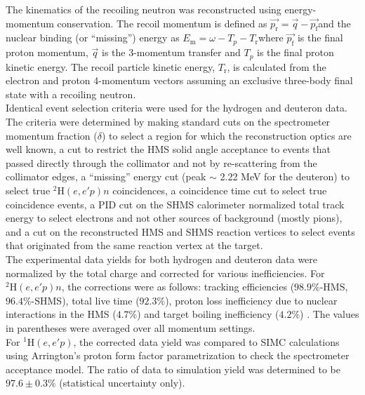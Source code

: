 \indent The kinematics of the recoiling neutron was reconstructed using energy-momentum conservation. The recoil momentum is defined as $\vec{p_{\mathrm{r}}} = \vec{q} - \vec{p_{\mathrm{f}}}$\DIFaddbegin \DIFadd{,
}\DIFaddend and the nuclear binding (or ``missing'') energy as $E_{\mathrm{m}} = \omega - T_{p} - T_{\mathrm{r}}$\DIFaddbegin \DIFadd{, }\DIFaddend where $\vec{p_{\mathrm{f}}}$ is the final proton momentum, $\vec{q}$ is the
3-momentum transfer and $T_{p}$ is the final proton kinetic energy. The recoil particle kinetic energy, $T_{\mathrm{r}}$, is calculated from the electron and proton
4-momentum vectors assuming an exclusive three-body final state with a recoiling neutron.\\
\indent Identical event selection criteria were used for the hydrogen and deuteron data. The criteria were determined by making standard cuts on the spectrometer momentum fraction ($\delta$) to select a region for which the reconstruction optics
are well known,  a cut to restrict the HMS solid angle acceptance to events that passed directly through the collimator and not by re-scattering from the collimator edges, a ``missing''
energy cut (peak $\sim$ 2.22 MeV for the deuteron) to select true $^{2}\mathrm{H}(e,e'p)n$ coincidences, a coincidence time cut to select true coincidence events, a PID cut on the
SHMS calorimeter normalized total track energy to select electrons and not other sources of background (mostly pions), and a cut on the reconstructed HMS and SHMS reaction vertices to select events that 
originated from the same reaction vertex at the target.\\
\indent The experimental data yields for both hydrogen and deuteron data were normalized by the total charge and corrected for various inefficiencies. For $^{2}\mathrm{H}(e,e'p)n$, the corrections
were as follows: tracking efficiencies ($98.9 \%$-HMS, $96.4 \%$-SHMS), total live time ($92.3 \%$), proton loss inefficiency due to nuclear interactions in the HMS ($4.7 \%$) \cite{cyero_phdthesis} and
target boiling inefficiency ($4.2 \%$) \cite{cyero_phdthesis}. The values in parentheses were averaged over all momentum settings. \\
\indent For $^{1}\mathrm{H}(e,e'p)$, the corrected data yield was compared to SIMC calculations using \DIFdelbegin {}\DIFdelend Arrington's proton form factor parametrization \cite{PhysRevC.69.022201} to check the spectrometer acceptance
model. The ratio of data to simulation yield was determined to be $97.6\pm0.3 \%$ (statistical uncertainty only).\\
